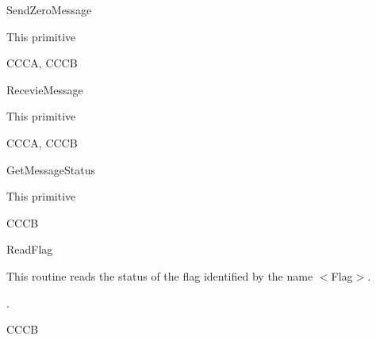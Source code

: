 \begin{function}{SendZeroMessage}
  \begin{fundescription}
    This primitive 
  \end{fundescription}
  \begin{funparameters}
  \end{funparameters}
  \begin{funreturn}
  \end{funreturn}
  \begin{funconformance}
    CCCA, CCCB
  \end{funconformance}
\end{function}

\begin{function}{RecevieMessage}
  \begin{fundescription}
    This primitive 
  \end{fundescription}
  \begin{funparameters}
  \end{funparameters}
  \begin{funreturn}
  \end{funreturn}
  \begin{funconformance}
    CCCA, CCCB
  \end{funconformance}
\end{function}

\begin{function}{GetMessageStatus}
  \begin{fundescription}
    This primitive 
  \end{fundescription}

  \begin{funreturn}
    \fret{}
  \end{funreturn}
  \begin{funconformance}
    CCCB
  \end{funconformance}
\end{function}


\begin{function}{ReadFlag}
	\begin{fundescription}
	This routine reads the status of the flag identified by the name $<$Flag$>$.
   	\end{fundescription}
  	\begin{funreturn}
   	.
   	\end{funreturn}
	\begin{funconformance}
     	 CCCB
     	\end{funconformance}
\end{function}

